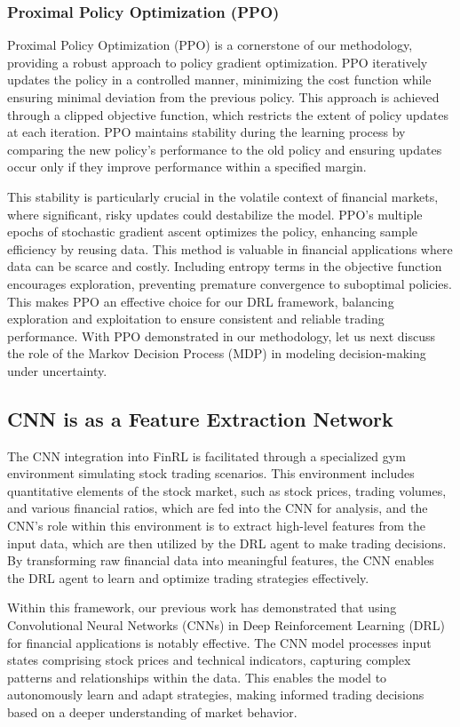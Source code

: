 \subsubsection{Proximal Policy Optimization (PPO)}
Proximal Policy Optimization (PPO) is a cornerstone of our methodology, providing a robust approach to policy gradient optimization. PPO iteratively updates the policy in a controlled manner, minimizing the cost function while ensuring minimal deviation from the previous policy. This approach is achieved through a clipped objective function, which restricts the extent of policy updates at each iteration. PPO maintains stability during the learning process by comparing the new policy's performance to the old policy and ensuring updates occur only if they improve performance within a specified margin. 

This stability is particularly crucial in the volatile context of financial markets, where significant, risky updates could destabilize the model. PPO's multiple epochs of stochastic gradient ascent optimizes the policy, enhancing sample efficiency by reusing data. This method is valuable in financial applications where data can be scarce and costly. Including entropy terms in the objective function encourages exploration, preventing premature convergence to suboptimal policies. This makes PPO an effective choice for our DRL framework, balancing exploration and exploitation to ensure consistent and reliable trading performance. With PPO demonstrated in our methodology, let us next discuss the role of the Markov Decision Process (MDP) in modeling decision-making under uncertainty.

\subsection{CNN is as a Feature Extraction Network}
The CNN integration into FinRL is facilitated through a specialized gym environment simulating stock trading scenarios. This environment includes quantitative elements of the stock market, such as stock prices, trading volumes, and various financial ratios, which are fed into the CNN for analysis, and the CNN's role within this environment is to extract high-level features from the input data, which are then utilized by the DRL agent to make trading decisions. By transforming raw financial data into meaningful features, the CNN enables the DRL agent to learn and optimize trading strategies effectively.

Within this framework, our previous work has demonstrated that using Convolutional Neural Networks (CNNs) in Deep Reinforcement Learning (DRL) for financial applications is notably effective. The CNN model processes input states comprising stock prices and technical indicators, capturing complex patterns and relationships within the data. This enables the model to autonomously learn and adapt strategies, making informed trading decisions based on a deeper understanding of market behavior.

